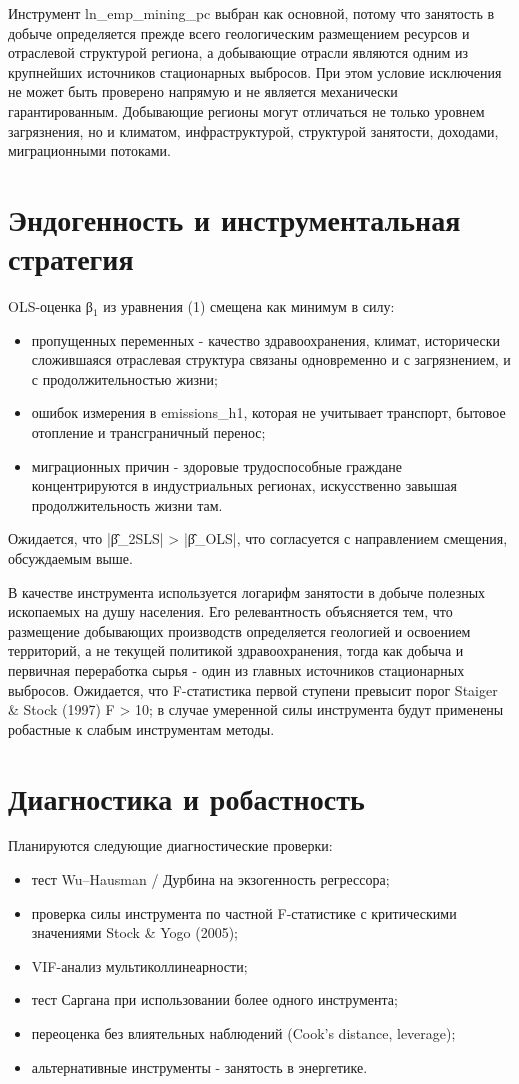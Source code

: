 \documentclass[11pt,a4paper]{article}
\begin{document}
Инструмент ln\_emp\_mining\_pc выбран как основной, потому что занятость в добыче определяется прежде всего геологическим размещением ресурсов и отраслевой структурой региона, а добывающие отрасли являются одним из крупнейших источников стационарных выбросов. При этом условие исключения не может быть проверено напрямую и не является механически гарантированным. Добывающие регионы могут отличаться не только уровнем загрязнения, но и климатом, инфраструктурой, структурой занятости, доходами, миграционными потоками.

\section*{Эндогенность и инструментальная стратегия}
OLS-оценка β$_1$ из уравнения (1) смещена как минимум в силу:

\begin{itemize}
\item пропущенных переменных - качество здравоохранения, климат, исторически сложившаяся отраслевая структура связаны одновременно и с загрязнением, и с продолжительностью жизни;
\item ошибок измерения в emissions\_h1, которая не учитывает транспорт, бытовое отопление и трансграничный перенос;
\item миграционных причин - здоровые трудоспособные граждане концентрируются в индустриальных регионах, искусственно завышая продолжительность жизни там.
\end{itemize}
Ожидается, что |β̂\_2SLS| > |β̂\_OLS|, что согласуется с направлением смещения, обсуждаемым выше.

В качестве инструмента используется логарифм занятости в добыче полезных ископаемых на душу населения. Его релевантность объясняется тем, что размещение добывающих производств определяется геологией и освоением территорий, а не текущей политикой здравоохранения, тогда как добыча и первичная переработка сырья - один из главных источников стационарных выбросов. Ожидается, что F-статистика первой ступени превысит порог Staiger \& Stock (1997) F > 10; в случае умеренной силы инструмента будут применены робастные к слабым инструментам методы.

\section*{Диагностика и робастность}
Планируются следующие диагностические проверки:
\begin{itemize}
\item тест Wu–Hausman / Дурбина на экзогенность регрессора;
\item проверка силы инструмента по частной F-статистике с критическими значениями Stock \& Yogo (2005);
\item VIF-анализ мультиколлинеарности;
\item тест Саргана при использовании более одного инструмента;
\item переоценка без влиятельных наблюдений (Cook's distance, leverage);
\item альтернативные инструменты - занятость в энергетике.
\end{itemize}
\end{document}
